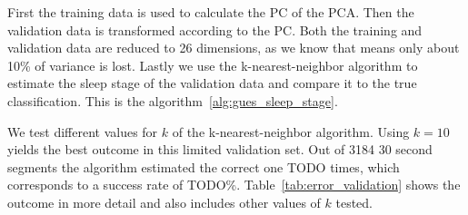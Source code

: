 First the training data is used to calculate the PC of the PCA. Then the validation data is transformed according to the PC. Both the training and validation data are reduced to 26 dimensions, as we know that means only about 10\% of variance is lost. Lastly we use the k-nearest-neighbor algorithm to estimate the sleep stage of the validation data and compare it to the true classification. This is the algorithm~\ref{alg:gues_sleep_stage}.

We test different values for $k$ of the k-nearest-neighbor algorithm. Using $k=10$ yields the best outcome in this limited validation set. Out of 3184 30 second segments the algorithm estimated the correct one TODO times, which corresponds to a success rate of TODO\%. Table~\ref{tab:error_validation} shows the outcome in more detail and also includes other values of $k$ tested.

